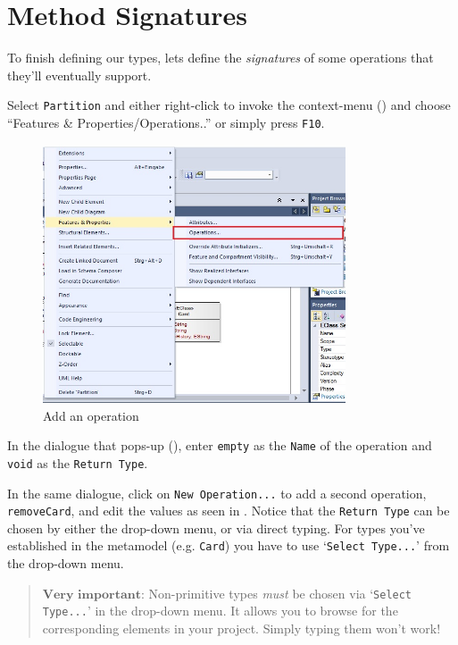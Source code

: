 \newpage
\section{Method Signatures}
\genHeader
\hypertarget{static:methods vis}{}

To finish defining our types, lets define the \emph{signatures} of some operations that they'll eventually support.

\begin{stepbystep}

\item  Select \texttt{Partition} and either right-click to invoke the context-menu ()  and choose ``Features \&
Properties/Operations..'' or simply press \texttt{F10}.

\begin{figure}[htbp]
	\centering
  \includegraphics[width=0.8\textwidth]{../../org.moflon.doc.handbook.02_leitnersLearningBox/2_staticSemantics/4_creatingMethods/cmVisImages/ea_contextAddOperation}
	\caption{Add an operation}
	\label{ea:add_operation}
\end{figure}
\FloatBarrier

\item  In the dialogue that pops-up (), enter \texttt{empty} as the \texttt{Name} of the operation and \texttt{void} as the \texttt{Return Type}.

\vspace{0.5cm}

\item  In the same dialogue, click on \texttt{New Operation...} to add a second operation, \texttt{removeCard}, and edit the values as seen in 
. Notice that the \texttt{Return Type} can be chosen by either the drop-down menu, or via direct typing. For types you've established in
the metamodel (e.g. \texttt{Card}) you have to use `\texttt{Select Type...}' from the drop-down menu.
\vspace{-.3cm}
\begin{quote}
{ \small
$\textbf{Very important:}$ Non-primitive types \emph{must} be chosen via `\texttt{Select Type...}' in the drop-down menu. It allows you to browse for the corresponding elements in
your project. Simply typing them won't work!
}
\end{quote}


\end{stepbystep}
